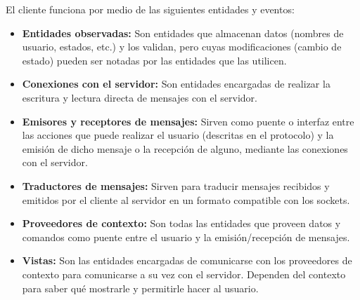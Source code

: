 El cliente funciona por medio de las siguientes entidades y eventos:
\begin{itemize}
	\item \textbf{Entidades observadas:} Son entidades que almacenan datos (nombres de usuario, estados, etc.) y los validan, pero cuyas modificaciones (cambio de estado) pueden ser notadas por las entidades que las utilicen.
	\item \textbf{Conexiones con el servidor:} Son entidades encargadas de realizar la escritura y lectura directa de mensajes con el servidor.
	\item \textbf{Emisores y receptores de mensajes:} Sirven como puente o interfaz entre las acciones que puede realizar el usuario (descritas en el protocolo) y la emisión de dicho mensaje o la recepción de alguno, mediante las conexiones con el servidor.
	\item \textbf{Traductores de mensajes:} Sirven para traducir mensajes recibidos y emitidos por el cliente al servidor en un formato compatible con los sockets.
	\item \textbf{Proveedores de contexto:} Son todas las entidades que proveen datos y comandos como puente entre el usuario y la emisión/recepción de mensajes.
	\item \textbf{Vistas:} Son las entidades encargadas de comunicarse con los proveedores de contexto para comunicarse a su vez con el servidor. Dependen del contexto para saber qué mostrarle y permitirle hacer al usuario.
\end{itemize}
